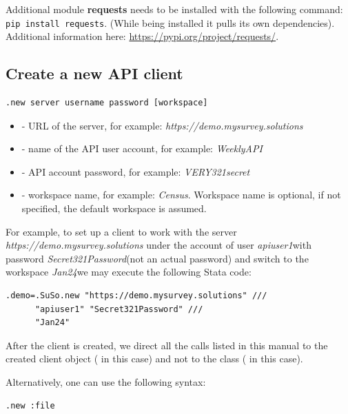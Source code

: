Additional module \textbf{requests} needs to be installed with the following
command: \texttt{pip install requests}. (While being installed it pulls its
own dependencies). Additional information here:
\href{https://pypi.org/project/requests/}{https://pypi.org/project/requests/}.

\vskip16pt
\subsection{Create a new API client}
\begin{lstlisting}
.new server username password [workspace]
\end{lstlisting}

\paramsheader
\begin{itemize}
\item {} - URL of the server, for example: \textquotedbl\textit{https://demo.mysurvey.solutions}\textquotedbl
\item {} - name of the API user account, for example: \textquotedbl\textit{WeeklyAPI}\textquotedbl
\item {} - API account password, for example: \textquotedbl\textit{VERY321secret}\textquotedbl
\item {} - workspace name, for example: \textquotedbl\textit{Census}\textquotedbl. Workspace name is optional, if not specified, the default workspace is assumed.
\end{itemize}

For example, to set up a client to work with the server
\textquotedbl\textit{https://demo.mysurvey.solutions}\textquotedbl
under the account of user \textquotedbl\textit{apiuser1}\textquotedbl  with password
\textquotedbl\textit{Secret321Password}\textquotedbl (not an actual password)
and switch to the workspace \textquotedbl\textit{Jan24}\textquotedbl we may
execute the following Stata code:

\begin{lstlisting}
.demo=.SuSo.new "https://demo.mysurvey.solutions" ///
      "apiuser1" "Secret321Password" ///
      "Jan24"
\end{lstlisting}

After the client is created, we direct all the calls listed in this manual to
the created client object ( in this case) and not to the class
( in this case).

Alternatively, one can use the following syntax:
\begin{lstlisting}
.new :file
\end{lstlisting}

